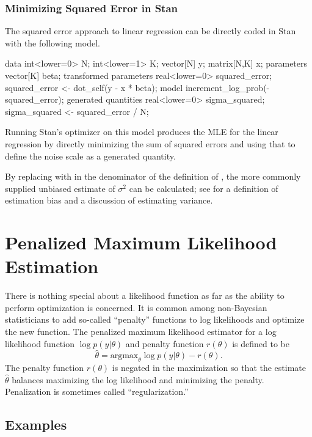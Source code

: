 \subsubsection{Minimizing Squared Error in Stan}

The squared error approach to linear regression can be directly coded
in Stan with the following model.
%
\begin{stancode}
data {
  int<lower=0> N;
  int<lower=1> K;
  vector[N] y;
  matrix[N,K] x;
}
parameters {
  vector[K] beta;
}
transformed parameters {
  real<lower=0> squared_error;
  squared_error <- dot_self(y - x * beta);
}
model {
  increment_log_prob(-squared_error);
}  
generated quantities {
  real<lower=0> sigma_squared;
  sigma_squared <- squared_error / N;
}
\end{stancode}
%
Running Stan's optimizer on this model produces the MLE for the linear
regression by directly minimizing the sum of squared errors and using
that to define the noise scale as a generated quantity.

By replacing  with  in the denominator of the
definition of , the more commonly supplied
unbiased estimate of $\sigma^2$ can be calculated; see
 for a definition of estimation bias and a
discussion of estimating variance.



\section{Penalized Maximum Likelihood Estimation}

There is nothing special about a likelihood function as far as the
ability to perform optimization is concerned.  It is common among
non-Bayesian statisticians to add so-called ``penalty'' functions
to log likelihoods and optimize the new function.  The penalized
maximum likelihood estimator for a log likelihood function 
$\log p(y|\theta)$ and penalty function $r(\theta)$ is defined to be
\[
\hat{\theta} = \mbox{argmax}_{\theta} \log p(y|\theta) - r(\theta).
\]
The penalty function $r(\theta)$ is negated in the maximization so
that the estimate $\hat{\theta}$ balances maximizing the log
likelihood and minimizing the penalty.  Penalization is sometimes
called ``regularization.''


\subsection{Examples}\label{penalized-mle-examples}

